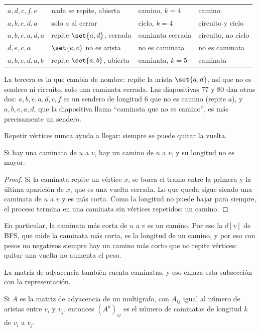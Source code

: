 \documentclass[11pt,letterpaper]{article}
\begin{document}
\begin{ejercicio}
\begin{center}
\begin{tabular}{llll}
    \midrule
    $a,d,c,f,e$ & nada se repite, abierta & camino, $k = 4$
      & camino \\
    $a,b,e,d,a$ & solo $a$ al cerrar & ciclo, $k = 4$
      & circuito y ciclo \\
    $a,b,e,a,d,a$ & repite $\set{a,d}$, cerrada
      & caminata cerrada & circuito, no ciclo \\
    $d,e,c,a$ & $\set{e,c}$ no es arista & no es caminata
      & no es caminata \\
    $a,b,e,d,a,b$ & repite $\set{a,b}$, abierta
      & caminata, $k = 5$ & caminata \\
    \bottomrule
  \end{tabular}
  \end{center}
  La tercera es la que cambia de nombre: repite la arista $\set{a,d}$,
  así que no es sendero ni circuito, solo una caminata cerrada. Las
  diapositivas 77 y 80 dan otras dos: $a, b, e, a, d, c, f$ es un
  sendero de longitud $6$ que no es camino (repite $a$), y
  $a, b, e, a, d$, que la diapositiva llama ``caminata que no es
  camino'', es más precisamente un sendero.
\end{ejercicio}

Repetir vértices nunca ayuda a llegar: siempre se puede quitar la
vuelta.

\begin{lema}
  \label{lem:caminata-camino}
  Si hay una caminata de $u$ a $v$, hay un camino de $u$ a $v$, y su
  longitud no es mayor.
\end{lema}

\begin{proof}
  Si la caminata repite un vértice $x$, se borra el tramo entre la
  primera y la última aparición de $x$, que es una vuelta cerrada. Lo
  que queda sigue siendo una caminata de $u$ a $v$ y es más corta. Como
  la longitud no puede bajar para siempre, el proceso termina en una
  caminata sin vértices repetidos: un camino.
\end{proof}

En particular, la caminata más corta de $u$ a $v$ es un camino. Por
eso la $d[v]$ de BFS, que mide la caminata más corta, es la longitud
de un camino, y por eso con pesos no negativos siempre hay un camino
más corto que no repite vértices: quitar una vuelta no aumenta el
peso.

La matriz de adyacencia también cuenta caminatas, y eso enlaza esta
subsección con la representación.

\begin{proposicion}
  \label{prop:potencias-adyacencia}
  Si $A$ es la matriz de adyacencia de un multigrafo, con $A_{ij}$
  igual al número de aristas entre $v_i$ y $v_j$, entonces
  $(A^{k})_{ij}$ es el número de caminatas de longitud $k$ de $v_i$ a
  $v_j$.
\end{proposicion}
\end{document}
